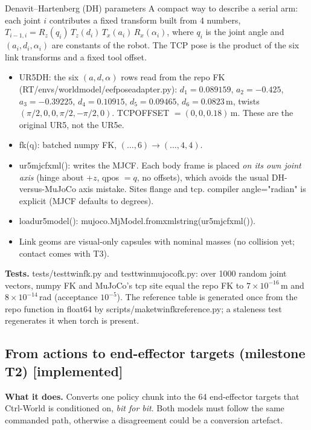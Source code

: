 \documentclass[11pt,a4paper]{article}
\newcommand{\done}{\textcolor{okgreen}{\textbf{[implemented]}}}
\newcommand{\code}[1]{{\small\ttfamily\begingroup\def\_{\textunderscore\allowbreak}\def\/{/\allowbreak}#1\endgroup}}
\begin{document}
\begin{newc}{Denavit--Hartenberg (DH) parameters}
A compact way to describe a serial arm: each joint $i$ contributes a fixed transform built from 4 numbers, $T_{i-1,i}=R_z(q_i)\,T_z(d_i)\,T_x(a_i)\,R_x(\alpha_i)$, where $q_i$ is the joint angle and $(a_i,d_i,\alpha_i)$ are constants of the robot. The TCP pose is the product of the six link transforms and a fixed tool offset.
\end{newc}

\begin{incode}[: \code{src/twin/robot.py}]
\begin{itemize}[leftmargin=*]
\item \code{UR5\_DH}: the six $(a,d,\alpha)$ rows read from the repo FK (\code{RT\/envs\/world\_model\/eef\_pose\_adapter.py}): $d_1=0.089159$, $a_2=-0.425$, $a_3=-0.39225$, $d_4=0.10915$, $d_5=0.09465$, $d_6=0.0823$\,m, twists $(\pi/2,0,0,\pi/2,-\pi/2,0)$. \code{TCP\_OFFSET} $=(0,0,0.18)$\,m. These are the original UR5, not the UR5e.
\item \code{fk(q)}: batched numpy FK, $(\ldots,6)\to(\ldots,4,4)$.
\item \code{ur5\_mjcf\_xml()}: writes the MJCF. Each body frame is placed \emph{on its own joint axis} (hinge about $+z$, \code{qpos} $=q$, no offsets), which avoids the usual DH-versus-MuJoCo axis mistake. Sites \code{flange} and \code{tcp}. \code{compiler angle="radian"} is explicit (MJCF defaults to degrees).
\item \code{load\_ur5\_model()}: \code{mujoco.MjModel.from\_xml\_string(ur5\_mjcf\_xml())}.
\item Link geoms are visual-only capsules with nominal masses (no collision yet; contact comes with T3).
\end{itemize}
\end{incode}

\textbf{Tests.} \code{tests/test\_twin\_fk.py} and \code{test\_twin\_mujoco\_fk.py}: over 1000 random joint vectors, numpy FK and MuJoCo's \code{tcp} site equal the repo FK to $7\times10^{-16}$\,m and $8\times10^{-14}$\,rad (acceptance $10^{-5}$). The reference table is generated once from the repo function in float64 by \code{scripts/make\_twin\_fk\_reference.py}; a staleness test regenerates it when torch is present.

\subsection{From actions to end-effector targets (milestone T2) \done}\label{sec:actions}
\textbf{What it does.} Converts one policy chunk into the 64 end-effector targets that Ctrl-World is conditioned on, \emph{bit for bit}. Both models must follow the same commanded path, otherwise a disagreement could be a conversion artefact.
\end{document}
